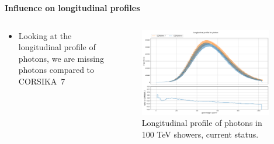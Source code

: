 \documentclass[aspectratio=1610, 9pt]{beamer}
\begin{document}
\begin{frame}

  \textbf{Influence on longitudinal profiles}
  \vspace{5mm}

    \begin{columns}[onlytextwidth]
        \begin{column}{0.4\textwidth}
            \begin{itemize}
              \item Looking at the longitudinal profile of photons, we are missing photons compared to CORSIKA~7
            \end{itemize}
        \end{column}
        \begin{column}{0.6\textwidth}
            \begin{figure}
                \centering
                \includegraphics[width=0.95\textwidth]{plots/long_photon_2023_full.png}
                \caption{Longitudinal profile of photons in 100 \si{\tera\electronvolt} showers, current status.}
            \end{figure}
        \end{column}
    \end{columns}
\end{frame}
\end{document}
